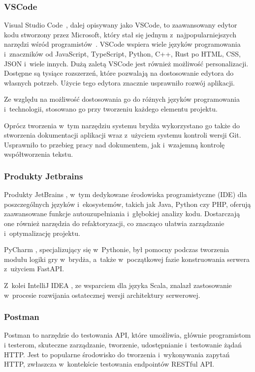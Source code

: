 \subsubsection{VSCode}

Visual Studio Code~\cite{VSCode}, dalej opisywany jako VSCode,
to zaawansowany edytor kodu stworzony
przez Microsoft, który stał się jednym z~najpopularniejszych narzędzi
wśród programistów~\cite{IDEIndex}.
VSCode wspiera wiele języków programowania i~znaczników od JavaScript,
TypeScript, Python, C++, Rust po HTML, CSS, JSON i~wiele innych.
Dużą zaletą VSCode jest również możliwość personalizacji. Dostępne są
tysiące rozszerzeń, które pozwalają na dostosowanie edytora do własnych
potrzeb. Użycie tego edytora znacznie usprawniło rozwój aplikacji.

Ze względu na możliwość dostosowania go do różnych języków programowania
i~technologii, stosowano go przy tworzeniu każdego elementu projektu.

Oprócz tworzenia w~tym narzędziu systemu brydża wykorzystano go także
do stworzenia dokumentacji aplikacji wraz z~użyciem systemu kontroli wersji Git.
Usprawniło to przebieg pracy nad dokumentem, jak i~wzajemną kontrolę
współtworzenia tekstu.


\subsubsection{Produkty Jetbrains}

Produkty JetBrains \cite{JetBrains}, w~tym dedykowane środowiska
programistyczne (IDE) dla poszczególnych języków i~ekosystemów,
takich jak Java, Python czy PHP, oferują zaawansowane funkcje
autouzupełniania i~głębokiej
analizy kodu. Dostarczają one również narzędzia do refaktoryzacji,
co znacząco ułatwia zarządzanie i~optymalizację projektu.

PyCharm \cite{PyCharm}, specjalizujący się w~Pythonie, był pomocny podczas tworzenia
modułu logiki gry w~brydża, a~także w~początkowej fazie konstruowania
serwera z~użyciem FastAPI.

Z~kolei IntelliJ IDEA \cite{Intellij}, ze wsparciem dla języka
Scala, znalazł zastosowanie w~procesie rozwijania ostatecznej wersji
architektury serwerowej.


\subsubsection{Postman}

Postman \cite{Postman} to narzędzie do testowania API, które umożliwia, głównie
programistom i testerom, skuteczne zarządzanie, tworzenie, udostępnianie
i~testowanie żądań HTTP. Jest to popularne środowisko do tworzenia
i~wykonywania zapytań HTTP, zwłaszcza w~kontekście testowania
endpointów RESTful API.

